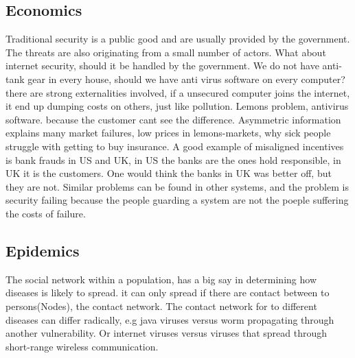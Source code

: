 \subsection{Economics}
Traditional security is a public good and are usually provided by the government. 
The threats are also originating from a small number of actors. 
What about internet security, should it be handled by the government.
 We do not have anti-tank gear in every house, should we have anti virus software on every computer?
 there are strong externalities involved, if a unsecured computer joins the internet, 
 it end up dumping costs on others, just like pollution. 
 Lemons problem, antivirus software. because the customer cant see the difference.
 Asymmetric information explains many market failures, low prices in lemons-markets, why sick people struggle with getting to buy insurance.
 A good example of misaligned incentives is bank frauds in US and UK, in US the banks are the ones hold responsible, in UK it is the customers. One would think the banks in UK was better off, but they are not. Similar problems can be found in other systems, and the problem is  security failing because the people guarding a system are not the poeple suffering the costs of failure. 
 \subsection{Epidemics}
 \cite{easley2012networks}
 The social network within a population, has a big say in determining how diseases is likely to
  spread. it can only spread if there are contact between to persons(Nodes), the contact network.
  The contact network for to different diseases can differ radically, e.g java viruses versus worm
   propagating through another vulnerability. Or internet viruses versus viruses that spread through short-range wireless communication. 
